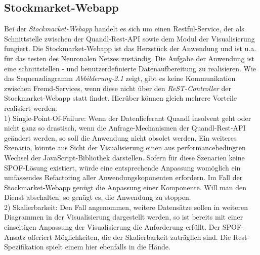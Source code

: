 \subsection{Stockmarket-Webapp}
Bei der \emph{Stockmarket-Webapp} handelt es sich um einen Restful-Service, der als Schnittstelle zwischen der Quandl-Rest-API sowie dem Modul der Visualisierung fungiert. Die Stockmarket-Webapp ist das Herzstück der Anwendung und ist u.a. für das testen des Neuronalen Netzes zuständig. Die Aufgabe der Anwendung ist eine schnittstellen - und benutzerdefinierte Datenaufbereitung zu realisieren. Wie das Sequenzdiagramm \emph{Abbilderung-2.1} zeigt, gibt es keine Kommunikation zwischen Fremd-Services, wenn diese nicht über den \emph{ReST-Controller} der Stockmarket-Webapp statt findet. Hierüber können gleich mehrere Vorteile realisiert werden.\\ 
1) Single-Point-Of-Failure: Wenn der Datenlieferant Quandl insolvent geht oder nicht ganz so drastisch, wenn die Anfrage-Mechanismen der Quandl-Rest-API geändert werden, so soll die Anwendung nicht obsolet werden. Ein weiteres Szenario, könnte aus Sicht der Visualisierung einen aus performancebedingten Wechsel der JavaScript-Bibliothek darstellen. Sofern für diese Szenarien keine SPOF-Lösung existiert, würde eine entsprechende Anpassung womöglich ein umfassendes Refactoring aller Anwendungskoponenten erfordern. Im Fall der Stockmarket-Webapp genügt die Anpassung einer Komponente. Will man den Dienst abschalten, so genügt es, die Anwendung zu stoppen.\\   
2) Skalierbarkeit: Den Fall angenommen, weitere Datensätze sollen in weiteren Diagrammen in der Visualisierung dargestellt werden, so ist bereits mit einer einseitigen Anpassung der Visualisierung die Anforderung erfüllt. Der SPOF-Ansatz offeriert Möglichkeiten, die der Skalierbarkeit zuträglich sind. Die Rest-Spezifikation spielt einem hier ebenfalls in die Hände.


